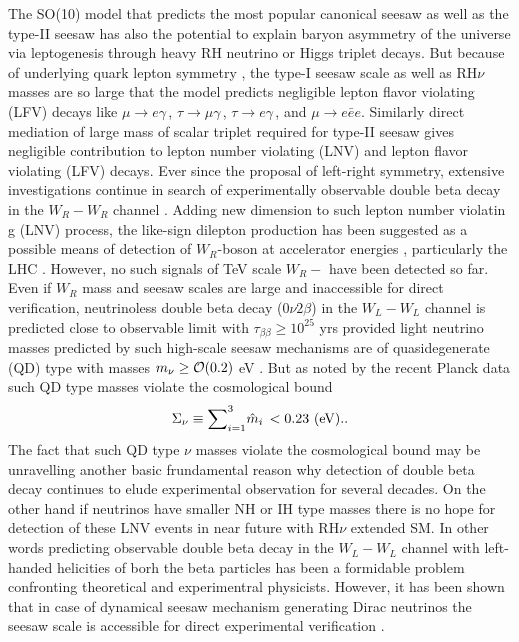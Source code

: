 \documentclass[a4paper,11pt]{article}
\newcommand{\be}{\begin{equation}}
\newcommand{\ee}{\end{equation}}
\begin{document}
The SO(10) model that predicts the  most popular canonical seesaw as
well as the type-II seesaw has also the potential to explain baryon asymmetry of the universe via
leptogenesis through heavy RH neutrino \cite{fukuyana:1986} or Higgs triplet  decays\cite{Hambye-gs}. But
because of underlying quark lepton symmetry \cite{JCP:1974}, the
type-I seesaw scale as well as RH$\nu$ masses are so large that the model
predicts negligible lepton flavor violating (LFV) decays like $\mu\to e\gamma \,$, $\tau\to
\mu\gamma \,$, $\tau\to e\gamma \,$, and $\mu \to e{\bar e}e$. Similarly
direct mediation of large mass of scalar triplet required for type-II
seesaw   gives negligible contribution to lepton number violating
(LNV) and lepton flavor violating (LFV) decays.
Ever since the proposal of left-right symmetry, extensive
investigations continue in search of experimentally observable double beta decay\cite{bbexpt1-Klapdoor,bbexpt2,bbexpt3} in the
$W_R-W_R$ channel \cite{gs:bb,mkp-bs:2015}. Adding new dimension to such lepton number violatin g (LNV) process, the
like-sign dilepton production  has been suggested as a
possible means of detection of $W_R$-boson at accelerator energies \cite{Keung-gs:1983},
particularly the LHC \cite{Bajc-gs:2007}. However, no such signals of TeV scale $W_R-$
 have been detected so far.
 Even if $W_R$ mass and seesaw scales are
large and  inaccessible for direct verification, neutrinoless
double beta decay ($0\nu 2\beta$) in the $W_L-W_L$ channel \cite{Valle:t2,Valle:bb1,Valle:nuD1,Valle:MajDM,Valle:nuD2,Valle:CPLRS,Valle:KeVDM} is predicted close to
observable limit with $\tau_{\beta \beta} \ge 10^{25}$ yrs provided
light neutrino masses predicted by such high-scale seesaw mechanisms
are of quasidegenerate (QD) type with masses $m_{\nu} \ge {\cal O}(0.2)$ eV \cite{bbexpt1-Klapdoor}.
But as noted by the recent Planck data such QD type masses   violate the
cosmological bound \cite{Planck15}
\be
\Sigma_{\nu}\equiv {\sum}_{i=1}^3 {\hat m}_i\, < 0.23~(\rm  eV). \label{eq:cbound}.
\ee
 The fact that such
QD type $\nu$ masses violate the cosmological bound may be unravelling another
basic frundamental reason  why  detection of double beta decay continues to
elude experimental observation for several decades. On the other hand if
neutrinos have smaller NH or IH type masses there is no hope for
detection of these LNV events in near future with RH$\nu$ extended SM.
In other words predicting observable double beta decay in the
$W_L-W_L$ channel with left-handed helicities of borh the beta
particles has been a formidable problem confronting theoretical and
experimentral physicists. However, it has been shown that in case of dynamical seesaw mechanism generating Dirac neutrinos the seesaw scale is accessible for direct experimental verification \cite{Valle:dynamical}.
\end{document}
